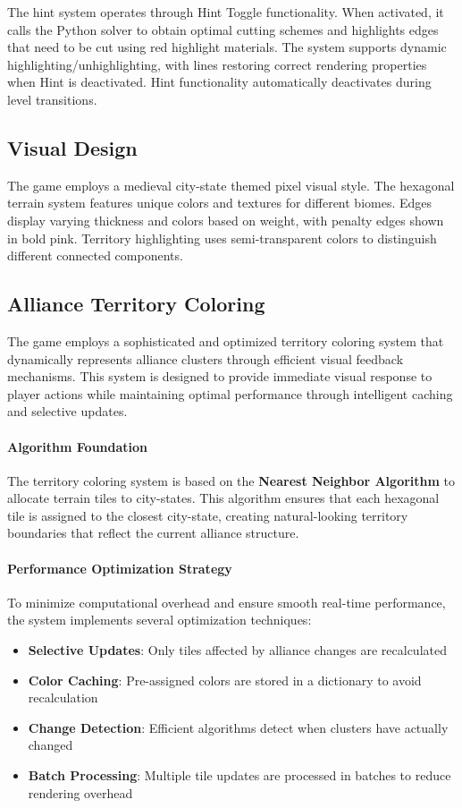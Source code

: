 \documentclass[english]{tudscrreprt}
\begin{document}
The hint system operates through Hint Toggle functionality. When activated, it calls the Python solver to obtain optimal cutting schemes and highlights edges that need to be cut using red highlight materials. The system supports dynamic highlighting/unhighlighting, with lines restoring correct rendering properties when Hint is deactivated. Hint functionality automatically deactivates during level transitions.

\subsection{Visual Design}
The game employs a medieval city-state themed pixel visual style. The hexagonal terrain system features unique colors and textures for different biomes. Edges display varying thickness and colors based on weight, with penalty edges shown in bold pink. Territory highlighting uses semi-transparent colors to distinguish different connected components.



\subsection{Alliance Territory Coloring}
The game employs a sophisticated and optimized territory coloring system that dynamically represents alliance clusters through efficient visual feedback mechanisms. This system is designed to provide immediate visual response to player actions while maintaining optimal performance through intelligent caching and selective updates.

\paragraph{Algorithm Foundation}
The territory coloring system is based on the \textbf{Nearest Neighbor Algorithm} to allocate terrain tiles to city-states. This algorithm ensures that each hexagonal tile is assigned to the closest city-state, creating natural-looking territory boundaries that reflect the current alliance structure.

\paragraph{Performance Optimization Strategy}
To minimize computational overhead and ensure smooth real-time performance, the system implements several optimization techniques:

\begin{itemize}
  \item \textbf{Selective Updates}: Only tiles affected by alliance changes are recalculated
  \item \textbf{Color Caching}: Pre-assigned colors are stored in a dictionary to avoid recalculation
  \item \textbf{Change Detection}: Efficient algorithms detect when clusters have actually changed
  \item \textbf{Batch Processing}: Multiple tile updates are processed in batches to reduce rendering overhead
\end{itemize}
\end{document}
